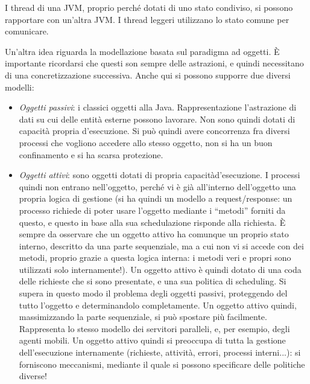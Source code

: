 I thread di una JVM, proprio perché dotati di uno stato condiviso, si possono rapportare con un'altra JVM. I thread
leggeri utilizzano lo stato comune per comunicare.

Un'altra idea riguarda la modellazione basata sul paradigma ad oggetti. È importante ricordarsi che questi son sempre
delle astrazioni, e quindi necessitano di una concretizzazione successiva. Anche qui si possono supporre due diversi
modelli:
\begin{itemize}
 \item \textit{Oggetti passivi}: i classici oggetti alla Java. Rappresentazione l'astrazione di dati su cui delle entità
esterne possono lavorare. Non sono quindi dotati di capacità propria d'esecuzione. Si può quindi avere concorrenza
fra diversi processi che vogliono accedere allo stesso oggetto, non si ha un buon confinamento e si ha scarsa
protezione.
  \item \textit{Oggetti attivi}: sono oggetti dotati di propria
capacitàd'esecuzione. I processi quindi non entrano nell'oggetto, perché vi è
già all'interno dell'oggetto una propria logica di gestione (si ha quindi un
modello a request/response: un processo richiede di poter usare l'oggetto
mediante i ``metodi'' forniti da questo, e questo in base alla sua schedulazione
risponde alla richiesta. È sempre da osservare che un oggetto attivo ha comunque
un proprio stato interno, descritto da una parte sequenziale, ma a cui non vi si
accede con dei metodi, proprio grazie a questa logica interna: i metodi veri e
propri sono utilizzati solo internamente!). Un oggetto attivo è quindi dotato di
una coda delle richieste che si sono presentate, e una sua politica di
scheduling. Si supera in questo modo il problema degli oggetti passivi,
proteggendo del tutto l'oggetto e determinandolo completamente. Un oggetto
attivo quindi, massimizzando la parte sequenziale, si può spostare più
facilmente. Rappresenta lo stesso modello dei servitori paralleli, e, per
esempio, degli agenti mobili. Un oggetto attivo quindi si preoccupa di tutta la
gestione dell'esecuzione internamente (richieste, attività, errori, processi
interni...): si forniscono meccanismi, mediante il quale si possono specificare
delle politiche diverse!
\end{itemize}

